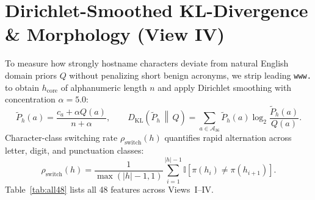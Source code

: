 \documentclass[12pt,a4paper]{report}
\begin{document}
\section{Dirichlet-Smoothed KL-Divergence \& Morphology (View IV)}
To measure how strongly hostname characters deviate from natural English domain priors $Q$ without penalizing short benign acronyms, we strip leading \texttt{www.} to obtain $h_{\text{core}}$ of alphanumeric length $n$ and apply Dirichlet smoothing with concentration $\alpha = 5.0$:
\begin{equation}
\tilde{P}_{h}(a) = \frac{c_a + \alpha Q(a)}{n + \alpha}, \qquad D_{\text{KL}}\!\left(\tilde{P}_h \,\middle\|\, Q\right) = \sum_{a \in \mathcal{A}_{36}} \tilde{P}_h(a) \log_2 \frac{\tilde{P}_h(a)}{Q(a)}.
\end{equation}
Character-class switching rate $\rho_{\text{switch}}(h)$ quantifies rapid alternation across letter, digit, and punctuation classes:
\begin{equation}
\rho_{\text{switch}}(h) = \frac{1}{\max(|h|-1, 1)} \sum_{i=1}^{|h|-1} \mathbb{I}\!\left[\pi(h_i) \neq \pi(h_{i+1})\right].
\end{equation}
Table~\ref{tab:all48} lists all 48 features across Views~I--IV.
\end{document}
